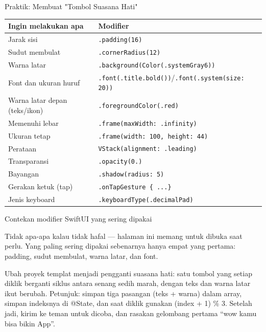 \begin{tcbpractice}{Praktik: Membuat "Tombol Suasana Hati"}

\begin{center}
\begin{tabularx}{\linewidth}{|X|X|}
\hline
\textbf{Ingin melakukan apa} & \textbf{Modifier} \tabularnewline
\hline
Jarak sisi & \texttt{.\allowbreak padding(16)} \tabularnewline
Sudut membulat & \texttt{.\allowbreak cornerRadius(12)} \tabularnewline
Warna latar & \texttt{.\allowbreak background(Color(.\allowbreak systemGray6))} \tabularnewline
Font dan ukuran huruf & \texttt{.\allowbreak font(.\allowbreak title.\allowbreak bold())}/\texttt{.\allowbreak font(.\allowbreak system(size: 20))} \tabularnewline
Warna latar depan (teks/ikon) & \texttt{.\allowbreak foregroundColor(.\allowbreak red)} \tabularnewline
Memenuhi lebar & \texttt{.\allowbreak frame(maxWidth: .\allowbreak infinity)} \tabularnewline
Ukuran tetap & \texttt{.\allowbreak frame(width: 100, height: 44)} \tabularnewline
Perataan & \texttt{VStack(alignment: .\allowbreak leading)} \tabularnewline
Transparansi & \texttt{.\allowbreak opacity(0.\allowbreak 6)} \tabularnewline
Bayangan & \texttt{.\allowbreak shadow(radius: 5)} \tabularnewline
Gerakan ketuk (tap) & \texttt{.\allowbreak onTapGesture \{ .\allowbreak .\allowbreak .\allowbreak  \}} \tabularnewline
Jenis keyboard & \texttt{.\allowbreak keyboardType(.\allowbreak decimalPad)} \tabularnewline
\hline
\end{tabularx}
\end{center}

\begin{center}\small\color{gray}Contekan modifier SwiftUI yang sering dipakai\end{center}

Tidak apa-apa kalau tidak hafal — halaman ini memang untuk dibuka saat perlu. Yang paling sering dipakai sebenarnya hanya empat yang pertama: padding, sudut membulat, warna latar, dan font.

Ubah proyek templat menjadi pengganti suasana hati: satu tombol yang setiap diklik berganti siklus antara senang sedih marah, dengan teks dan warna latar ikut berubah. Petunjuk: simpan tiga pasangan (teks + warna) dalam array, simpan indeksnya di @State, dan saat diklik gunakan (index + 1) \% 3. Setelah jadi, kirim ke teman untuk dicoba, dan rasakan gelombang pertama “wow kamu bisa bikin App”.

\end{tcbpractice}

